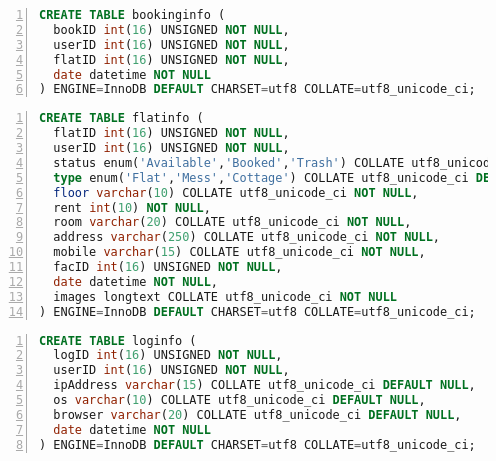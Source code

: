 \begin{lstlisting}[caption={A SQL command for Creating table named booking-info}, label=list:sql, captionpos=b,
           backgroundcolor=\color{white},
           language=SQL,
           breaklines=true,
           frame=single,
           showspaces=false,
           basicstyle=\ttfamily,
           numbers=left,
           numberstyle=\tiny,
           rulecolor=\color{red},
           keywordstyle=\color{blue},
           commentstyle=\color{gray}
           ]
CREATE TABLE bookinginfo (
  bookID int(16) UNSIGNED NOT NULL,
  userID int(16) UNSIGNED NOT NULL,
  flatID int(16) UNSIGNED NOT NULL,
  date datetime NOT NULL
) ENGINE=InnoDB DEFAULT CHARSET=utf8 COLLATE=utf8_unicode_ci;
\end{lstlisting}
\begin{lstlisting}[caption={A SQL command for Creating table named Flat-info}, label=list:sql, captionpos=b,
           backgroundcolor=\color{white},
           language=SQL,
           breaklines=true,
           frame=single,
           showspaces=false,
           basicstyle=\ttfamily,
           numbers=left,
           numberstyle=\tiny,
           rulecolor=\color{red},
           keywordstyle=\color{blue},
           commentstyle=\color{gray}
           ]
CREATE TABLE flatinfo (
  flatID int(16) UNSIGNED NOT NULL,
  userID int(16) UNSIGNED NOT NULL,
  status enum('Available','Booked','Trash') COLLATE utf8_unicode_ci DEFAULT 'Available',
  type enum('Flat','Mess','Cottage') COLLATE utf8_unicode_ci DEFAULT 'Flat',
  floor varchar(10) COLLATE utf8_unicode_ci NOT NULL,
  rent int(10) NOT NULL,
  room varchar(20) COLLATE utf8_unicode_ci NOT NULL,
  address varchar(250) COLLATE utf8_unicode_ci NOT NULL,
  mobile varchar(15) COLLATE utf8_unicode_ci NOT NULL,
  facID int(16) UNSIGNED NOT NULL,
  date datetime NOT NULL,
  images longtext COLLATE utf8_unicode_ci NOT NULL
) ENGINE=InnoDB DEFAULT CHARSET=utf8 COLLATE=utf8_unicode_ci;
\end{lstlisting}
\begin{lstlisting}[caption={A SQL command for Creating table named logInfo}, label=list:sql, captionpos=b,
           backgroundcolor=\color{white},
           language=SQL,
           breaklines=true,
           frame=single,
           showspaces=false,
           basicstyle=\ttfamily,
           numbers=left,
           numberstyle=\tiny,
           rulecolor=\color{red},
           keywordstyle=\color{blue},
           commentstyle=\color{gray}
           ]
 CREATE TABLE loginfo (
  logID int(16) UNSIGNED NOT NULL,
  userID int(16) UNSIGNED NOT NULL,
  ipAddress varchar(15) COLLATE utf8_unicode_ci DEFAULT NULL,
  os varchar(10) COLLATE utf8_unicode_ci DEFAULT NULL,
  browser varchar(20) COLLATE utf8_unicode_ci DEFAULT NULL,
  date datetime NOT NULL
) ENGINE=InnoDB DEFAULT CHARSET=utf8 COLLATE=utf8_unicode_ci;
\end{lstlisting}


